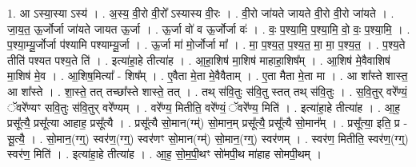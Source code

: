 \documentclass[17pt]{extarticle}
\begin{document}
1. आ ऽस्या॒स्या ऽस्य॑ । . अ॒स्य॒ वी॒रो वी॒रो᳚ ऽस्यास्य वी॒रः । . वी॒रो जा॑यते जायते वी॒रो वी॒रो जा॑यते । . जा॒य॒त॒ ऊ॒र्जोर्जा जा॑यते जायत ऊ॒र्जा । . ऊ॒र्जा वो॑ व ऊ॒र्जोर्जा वः॑ । . वः॒ प॒श्या॒मि॒ प॒श्या॒मि॒ वो॒ वः॒ प॒श्या॒मि॒ । . प॒श्या॒म्यू॒र्जोर्जा प॑श्यामि पश्याम्यू॒र्जा । . ऊ॒र्जा मा॑ मो॒र्जोर्जा मा᳚ । . मा॒ प॒श्य॒त॒ प॒श्य॒त॒ मा॒ मा॒ प॒श्य॒त॒ । . प॒श्य॒ते तीति॑ पश्यत पश्य॒ते ति॑ । . इत्या॑हा॒हे तीत्या॑ह । . आ॒हा॒शिष॑ मा॒शिष॑ माहाहा॒शिष᳚म् । . आ॒शिष॑ मे॒वैवाशिष॑ मा॒शिष॑ मे॒व । . आ॒शिष॒मित्या᳚ - शिष᳚म् । . ए॒वैता मे॒ता मे॒वैवैताम् । . ए॒ता मैता मे॒ता मा । . आ शा᳚स्ते शास्त॒ आ शा᳚स्ते । . शा॒स्ते॒ तत् तच्छा᳚स्ते शास्ते॒ तत् । . तथ् स॑वि॒तुः स॑वि॒तु स्तत् तथ् स॑वि॒तुः । . स॒वि॒तुर् वरे᳚ण्यं॒ ॅवरे᳚ण्यꣳ सवि॒तुः स॑वि॒तुर् वरे᳚ण्यम् । . वरे᳚ण्य॒ मितीति॒ वरे᳚ण्यं॒ ॅवरे᳚ण्य॒ मिति॑ । . इत्या॑हा॒हे तीत्या॑ह । . आ॒ह॒ प्रसू᳚त्यै॒ प्रसू᳚त्या आहाह॒ प्रसू᳚त्यै । . प्रसू᳚त्यै सो॒मान(ग्म्॑) सो॒मान॒म् प्रसू᳚त्यै॒ प्रसू᳚त्यै सो॒मान᳚म् । . प्रसू᳚त्या॒ इति॒ प्र - सू॒त्यै॒ । . सो॒मान॒(ग्ग्॒) स्वर॑ण॒(ग्ग्॒) स्वर॑णꣳ सो॒मान(ग्म्॑) सो॒मान॒(ग्ग्॒) स्वर॑णम् । . स्वर॑ण॒ मितीति॒ स्वर॑ण॒(ग्ग्॒) स्वर॑ण॒ मिति॑ । . इत्या॑हा॒हे तीत्या॑ह । . आ॒ह॒ सो॒म॒पी॒थꣳ सो॑मपी॒थ मा॑हाह सोमपी॒थम् । \newline
\end{document}
